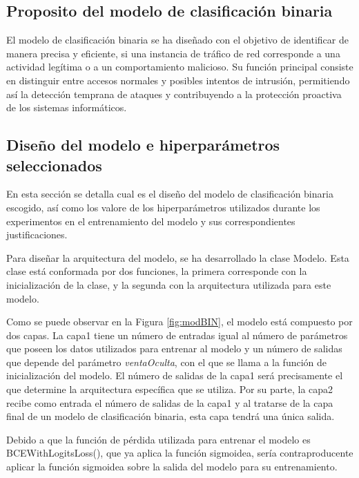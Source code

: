 
\subsection{Proposito del modelo de clasificación binaria}
El modelo de clasificación binaria se ha diseñado con el objetivo de identificar de manera precisa y eficiente, si una instancia de tráfico de red corresponde a una actividad legítima o a un comportamiento malicioso. Su función principal consiste en distinguir entre accesos normales y posibles intentos de intrusión, permitiendo así la detección temprana de ataques y contribuyendo a la protección proactiva de los sistemas informáticos.

\subsection{Diseño del modelo e hiperparámetros seleccionados} \label{sec:disBIN}
En esta sección se detalla cual es el diseño del modelo de clasificación binaria escogido, así como los valore de los hiperparámetros utilizados durante los experimentos en el entrenamiento del modelo y sus correspondientes justificaciones.

Para diseñar la arquitectura del modelo, se ha desarrollado la clase Modelo. Esta clase está conformada por dos funciones, la primera corresponde con la inicialización de la clase, y la segunda con la arquitectura utilizada para este modelo.

Como se puede observar en la Figura \ref{fig:modBIN}, el modelo está compuesto por dos capas. La capa1 tiene un número de entradas igual al número de parámetros que poseen los datos utilizados para entrenar al modelo y un número de salidas que depende del parámetro \textit{ventaOculta}, con el que se llama a la función de inicialización del modelo. El número de salidas de la capa1 será precisamente el que determine la arquitectura específica que se utiliza. Por su parte, la capa2 recibe como entrada el número de salidas de la capa1 y al tratarse de la capa final de un modelo de clasificación binaria, esta capa tendrá una única salida.

Debido a que la función de pérdida utilizada para entrenar el modelo es BCEWithLogitsLoss(), que ya aplica la función sigmoidea, sería contraproducente aplicar la función sigmoidea sobre la salida del modelo para su entrenamiento.


